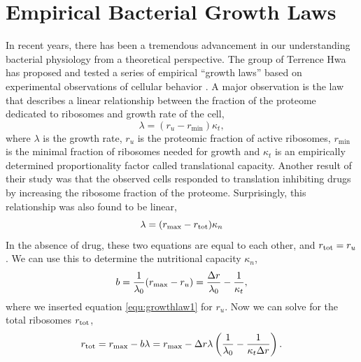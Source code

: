 \section{Empirical Bacterial Growth Laws}
\label{sec:emp_laws}

In recent years, there has been a tremendous advancement in our understanding
bacterial physiology from a theoretical perspective. The group of
Terrence Hwa has proposed and tested a series of empirical ``growth laws'' based on experimental observations of cellular behavior \cite{Scott2010,Deris2013}. A major observation is the law that describes a linear relationship between the fraction of the proteome dedicated to ribosomes and growth rate of the cell,
\begin{equation}
    \lambda = (r_u - r_\mathrm{min})\kappa_t\label{equ:growthlaw1},
\end{equation}
where $\lambda$ is the growth rate, $r_u$ is the proteomic fraction of active ribosomes, $r_\mathrm{min}$ is the minimal fraction of ribosomes needed for growth and $\kappa_t$ is an empirically determined proportionality factor called translational capacity. Another result of their study was that the observed cells responded to translation inhibiting drugs by increasing the ribosome fraction of the proteome. Surprisingly, this relationship was also found to be linear,
\begin{equation}
    \lambda = (r_\mathrm{max} - r_{\mathrm{tot}}) \kappa_n\label{equ:growthlaw2}
\end{equation}
In the absence of drug, these two equations are equal to each other, and $r_{\mathrm{tot}} = r_u$. We can use this to determine the nutritional capacity $\kappa_n$,
\begin{equation}
    b=\frac{1}{\lambda_0}(r_{\mathrm{max}}-r_u)=\frac{\Delta r}{\lambda_0} - \frac{1}{\kappa_t},
\end{equation}
where we inserted equation \ref{equ:growthlaw1} for $r_u$. Now we can solve for the total ribosomes $r_{\mathrm{tot}}$,
\begin{equation}
    r_{\mathrm{tot}} = r_{\mathrm{max}} - b\lambda = r_{\mathrm{max}} - \Delta r\lambda \left( \frac{1}{\lambda_0} - \frac{1}{\kappa_t\Delta r} \right)\label{equ:rtot}.
\end{equation}


